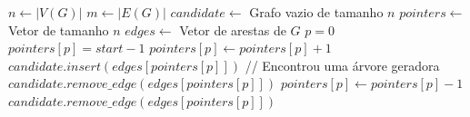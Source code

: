 % 
% 

\begin{algorithm}[!ht]
\begin{footnotesize}
\SetAlgoLined
{}
\Begin
{
    $n \gets |V(G)|$\;
    $m \gets |E(G)|$\;
    $candidate \gets$ Grafo vazio de tamanho $n$\;
    $pointers \gets$ Vetor de tamanho $n$\;
    $edges \gets$ Vetor de arestas de $G$\;
    $p = 0$\;
    $pointers[p] = start - 1$\;
    {
        $pointers[p] \gets pointers[p] + 1$\;
        {
            $candidate.insert(edges[pointers[p]])$\;
            {
                {
                    // Encontrou uma árvore geradora
                }
                 $candidate.remove\_edge(edges[pointers[p]])$\;
            }
        }
        \Else
        {
            $pointers[p] \gets pointers[p] - 1$\;
            {
                $candidate.remove\_edge(edges[pointers[p]])$\;
            }
        }    
    }
}
\caption{\textsc{$generate\_parallel$}\label{alg:generate_parallel}}
\end{footnotesize}
\end{algorithm}